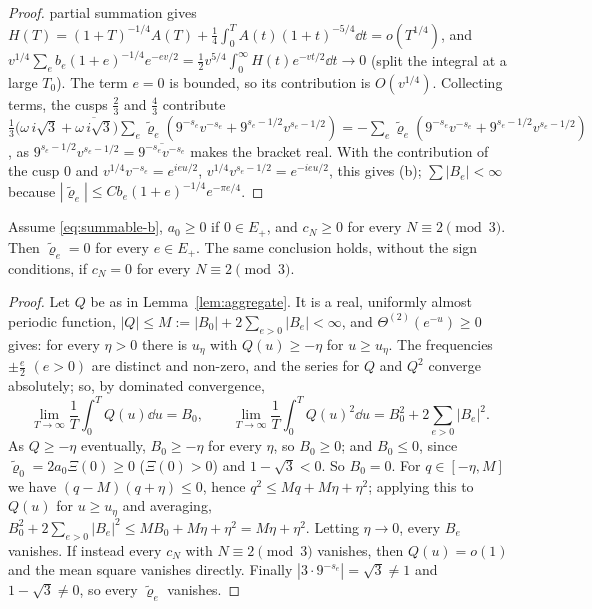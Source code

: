 \begin{proof}
partial summation gives $H(T)=(1+T)^{-1/4}A(T)+\frac14\int_0^TA(t)(1+t)^{-5/4}\dd t=o(T^{1/4})$, and
$v^{1/4}\sum_eb_e(1+e)^{-1/4}e^{-ev/2}=\frac12v^{5/4}\int_0^\infty H(t)e^{-vt/2}\dd t\to0$ (split the integral at a large $T_0$). The term $e=0$ is
bounded, so its contribution is $O(v^{1/4})$. Collecting terms, the cusps $\frac23$ and $\frac43$ contribute
$\frac13\big(\omega\,i\sqrt3+\overline{\omega\,i\sqrt3}\big)\sum_e\tilde\varrho_e(9^{-s_e}v^{-s_e}+9^{s_e-1/2}v^{s_e-1/2})=-\sum_e\tilde\varrho_e(9^{-s_e}v^{-s_e}+9^{s_e-1/2}v^{s_e-1/2})$,
as $9^{s_e-1/2}v^{s_e-1/2}=\overline{9^{-s_e}v^{-s_e}}$ makes the bracket real. With the contribution of the cusp $0$ and
$v^{1/4}v^{-s_e}=e^{ieu/2}$, $v^{1/4}v^{s_e-1/2}=e^{-ieu/2}$, this gives (b); $\sum|B_e|<\infty$ because $|\tilde\varrho_e|\le Cb_e(1+e)^{-1/4}e^{-\pi e/4}$.
\end{proof}

\begin{lemma}\label{lem:meanvalue}
Assume \eqref{eq:summable-b}, $a_0\ge0$ if $0\in E_+$, and $c_N\ge0$ for every $N\equiv2\pmod3$. Then $\tilde\varrho_e=0$ for every $e\in E_+$.
The same conclusion holds, without the sign conditions, if $c_N=0$ for every $N\equiv2\pmod3$.\astranote
\end{lemma}

\begin{proof}
Let $Q$ be as in Lemma~\ref{lem:aggregate}. It is a real, uniformly almost periodic function, $|Q|\le M:=|B_0|+2\sum_{e>0}|B_e|<\infty$, and
$\Theta^{(2)}(e^{-u})\ge0$ gives: for every $\eta>0$ there is $u_\eta$ with $Q(u)\ge-\eta$ for $u\ge u_\eta$. The frequencies $\pm\frac e2$
$(e>0)$ are distinct and non-zero, and the series for $Q$ and $Q^2$ converge absolutely; so, by dominated convergence,
\[
\lim_{T\to\infty}\frac1T\int_0^TQ(u)\dd u=B_0,\qquad \lim_{T\to\infty}\frac1T\int_0^TQ(u)^2\dd u=B_0^2+2\sum_{e>0}|B_e|^2.
\]
As $Q\ge-\eta$ eventually, $B_0\ge-\eta$ for every $\eta$, so $B_0\ge0$; and $B_0\le0$, since $\tilde\varrho_0=2a_0\Xi(0)\ge0$ ($\Xi(0)>0$) and
$1-\sqrt3<0$. So $B_0=0$. For $q\in[-\eta,M]$ we have $(q-M)(q+\eta)\le0$, hence $q^2\le Mq+M\eta+\eta^2$; applying this to $Q(u)$ for $u\ge u_\eta$
and averaging, $B_0^2+2\sum_{e>0}|B_e|^2\le MB_0+M\eta+\eta^2=M\eta+\eta^2$. Letting $\eta\to0$, every $B_e$ vanishes. If instead every $c_N$ with
$N\equiv2\pmod3$ vanishes, then $Q(u)=o(1)$ and the mean square vanishes directly. Finally $|3\cdot9^{-s_e}|=\sqrt3\ne1$ and
$1-\sqrt3\ne0$, so every $\tilde\varrho_e$ vanishes.
\end{proof}

